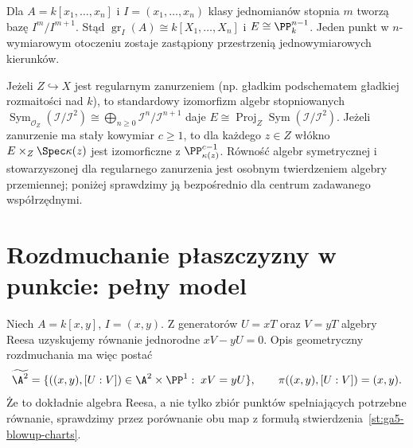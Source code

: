 \begin{przyklad}[Punkt w $\A^n$]
Dla $A=k[x_1,\ldots,x_n]$ i
$I=(x_1,\ldots,x_n)$ klasy jednomianów stopnia $m$
tworzą bazę $I^m/I^{m+1}$. Stąd
$\operatorname{gr}_I(A)\cong k[X_1,\ldots,X_n]$
i $E\cong\PP^{n-1}_k$.
Jeden punkt w $n$-wymiarowym otoczeniu zostaje
zastąpiony przestrzenią jednowymiarowych kierunków.
\end{przyklad}

\begin{uwaga}
Jeżeli $Z\hookrightarrow X$ jest regularnym zanurzeniem
(np. gładkim podschematem gładkiej rozmaitości nad $k$),
to standardowy izomorfizm algebr stopniowanych
$\operatorname{Sym}_{\mathcal O_Z}(\mathcal I/\mathcal I^2)
\cong\bigoplus_{n\ge0}\mathcal I^n/\mathcal I^{n+1}$
daje
$E\cong\operatorname{Proj}_Z
\operatorname{Sym}(\mathcal I/\mathcal I^2)$.
Jeżeli zanurzenie ma stały kowymiar $c\ge1$, to dla każdego
$z\in Z$ włókno $E\times_Z\Spec\kappa(z)$ jest
izomorficzne z $\PP^{c-1}_{\kappa(z)}$. Równość algebr
symetrycznej i stowarzyszonej dla regularnego zanurzenia
jest osobnym twierdzeniem algebry przemiennej;
poniżej sprawdzimy ją bezpośrednio dla centrum
zadawanego współrzędnymi.
\end{uwaga}

\section{Rozdmuchanie płaszczyzny w punkcie: pełny model}
\label{sec:ga5-plane}

Niech $A=k[x,y]$, $I=(x,y)$. Z generatorów
$U=xT$ oraz $V=yT$ algebry Reesa uzyskujemy
równanie jednorodne $xV-yU=0$. Opis geometryczny
rozdmuchania ma więc postać
\[
 \widetilde{\A^2}
 =\{((x,y),[U:V])\in\A^2\times\PP^1:\;xV=yU\},
 \qquad \pi((x,y),[U:V])=(x,y).
\]
Że to dokładnie algebra Reesa, a nie tylko zbiór
punktów spełniających potrzebne równanie, sprawdzimy
przez porównanie obu map z formułą
stwierdzenia~\ref{st:ga5-blowup-charts}.

